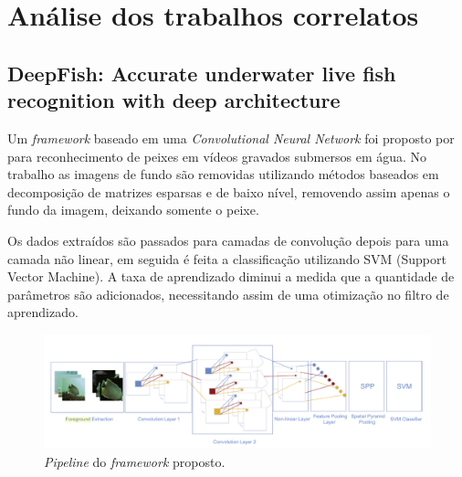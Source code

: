  



\section{Análise dos trabalhos correlatos}

\subsection{DeepFish: Accurate underwater live fish recognition with deep architecture}
Um \textit{framework} baseado em uma \textit{Convolutional Neural Network} foi proposto por  para reconhecimento de peixes em vídeos gravados submersos em água. No trabalho as imagens de fundo são removidas utilizando métodos baseados em decomposição de matrizes esparsas e de baixo nível, removendo assim apenas o fundo da imagem, deixando somente o peixe.

Os dados extraídos são passados para camadas de convolução depois para uma camada não linear, em seguida é feita a classificação utilizando SVM (Support Vector Machine). A taxa de aprendizado diminui a medida que a quantidade de parâmetros são adicionados, necessitando assim de uma otimização no filtro de aprendizado. 

\begin{figure}[h]
	\caption{\label{fig:trainignqin}\textit{Pipeline} do \textit{framework} proposto.}
	\begin{center}
	    \includegraphics[width=1\textwidth]{resources/trainingqin}
	\end{center}
\end{figure}
   

